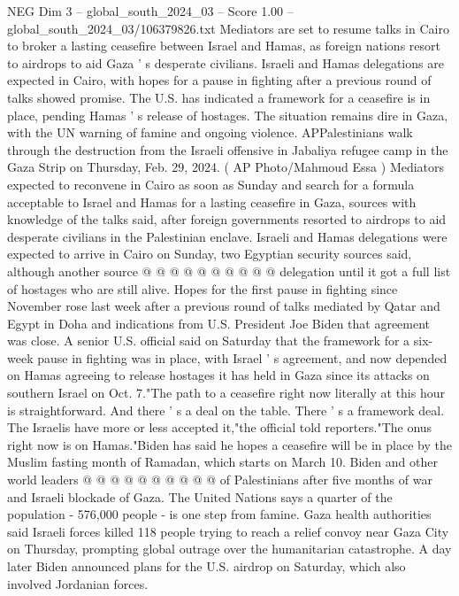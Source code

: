\begin{textsample}{NEG Dim 3 – global\_south\_2024\_03 – Score 1.00 – global\_south\_2024\_03/106379826.txt}  \label{ex:f3_neg_038}
Mediators are set to resume talks in Cairo to broker a lasting ceasefire between Israel and Hamas, as foreign nations resort to airdrops to aid Gaza ' s desperate civilians.
Israeli and Hamas delegations are expected in Cairo, with hopes for a pause in fighting after a previous round of talks showed promise.
The U.S. has indicated a framework for a ceasefire is in place, pending Hamas ' s release of hostages.
The situation remains dire in Gaza, with the UN warning of famine and ongoing violence.
APPalestinians walk through the destruction from the Israeli offensive in Jabaliya refugee camp in the Gaza Strip on Thursday, Feb. 29, 2024. ( AP Photo/Mahmoud Essa ) Mediators expected to reconvene in Cairo as soon as Sunday and search for a formula acceptable to Israel and Hamas for a lasting ceasefire in Gaza, sources with knowledge of the talks said, after foreign governments resorted to airdrops to aid desperate civilians in the Palestinian enclave.
Israeli and Hamas delegations were expected to arrive in Cairo on Sunday, two Egyptian security sources said, although another source @ @ @ @ @ @ @ @ @ @ delegation until it got a full list of hostages who are still alive.
Hopes for the first pause in fighting since November rose last week after a previous round of talks mediated by Qatar and Egypt in Doha and indications from U.S.
President Joe Biden that agreement was close.
A senior U.S. official said on Saturday that the framework for a six-week pause in fighting was in place, with Israel ' s agreement, and now depended on Hamas agreeing to release hostages it has held in Gaza since its attacks on southern Israel on Oct. 7."The path to a ceasefire right now literally at this hour is straightforward.
And there ' s a deal on the table.
There ' s a framework deal.
The Israelis have more or less accepted it,"the official told reporters."The onus right now is on Hamas."Biden has said he hopes a ceasefire will be in place by the Muslim fasting month of Ramadan, which starts on March 10.
Biden and other world leaders @ @ @ @ @ @ @ @ @ @ of Palestinians after five months of war and Israeli blockade of Gaza.
The United Nations says a quarter of the population - 576,000 people - is one step from famine.
Gaza health authorities said Israeli forces killed 118 people trying to reach a relief convoy near Gaza City on Thursday, prompting global outrage over the humanitarian catastrophe.
A day later Biden announced plans for the U.S. airdrop on Saturday, which also involved Jordanian forces.

\end{textsample}
